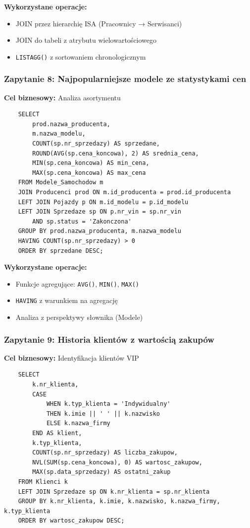 \documentclass[a4paper,titleauthor]{mwart}
\begin{document}
	\textbf{Wykorzystane operacje:}
	\begin{itemize}
		\item JOIN przez hierarchię ISA (Pracownicy → Serwisanci)
		\item JOIN do tabeli z atrybutu wielowartościowego
		\item \texttt{LISTAGG()} z sortowaniem chronologicznym
	\end{itemize}

	\subsubsection{Zapytanie 8: Najpopularniejsze modele ze statystykami cen}

	\textbf{Cel biznesowy:} Analiza asortymentu

	\begin{verbatim}
	SELECT 
		prod.nazwa_producenta,
		m.nazwa_modelu,
		COUNT(sp.nr_sprzedazy) AS sprzedane,
		ROUND(AVG(sp.cena_koncowa), 2) AS srednia_cena,
		MIN(sp.cena_koncowa) AS min_cena,
		MAX(sp.cena_koncowa) AS max_cena
	FROM Modele_Samochodow m
	JOIN Producenci prod ON m.id_producenta = prod.id_producenta
	LEFT JOIN Pojazdy p ON m.id_modelu = p.id_modelu
	LEFT JOIN Sprzedaze sp ON p.nr_vin = sp.nr_vin 
		AND sp.status = 'Zakonczona'
	GROUP BY prod.nazwa_producenta, m.nazwa_modelu
	HAVING COUNT(sp.nr_sprzedazy) > 0
	ORDER BY sprzedane DESC;
	\end{verbatim}

	\textbf{Wykorzystane operacje:}
	\begin{itemize}
		\item Funkcje agregujące: \texttt{AVG()}, \texttt{MIN()}, \texttt{MAX()}
		\item \texttt{HAVING} z warunkiem na agregację
		\item Analiza z perspektywy słownika (Modele)
	\end{itemize}

	\subsubsection{Zapytanie 9: Historia klientów z wartością zakupów}

	\textbf{Cel biznesowy:} Identyfikacja klientów VIP

	\begin{verbatim}
	SELECT 
		k.nr_klienta,
		CASE 
			WHEN k.typ_klienta = 'Indywidualny' 
			THEN k.imie || ' ' || k.nazwisko
			ELSE k.nazwa_firmy
		END AS klient,
		k.typ_klienta,
		COUNT(sp.nr_sprzedazy) AS liczba_zakupow,
		NVL(SUM(sp.cena_koncowa), 0) AS wartosc_zakupow,
		MAX(sp.data_sprzedazy) AS ostatni_zakup
	FROM Klienci k
	LEFT JOIN Sprzedaze sp ON k.nr_klienta = sp.nr_klienta
	GROUP BY k.nr_klienta, k.imie, k.nazwisko, k.nazwa_firmy, k.typ_klienta
	ORDER BY wartosc_zakupow DESC;
	\end{verbatim}
\end{document}
